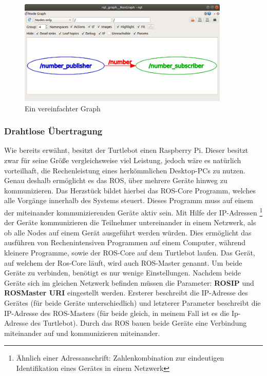 {{{			\begin{figure}
				\centering
				\includegraphics[height=5cm]{Bilder/rqt_graph_simplified.png}
				\caption{Ein vereinfachter Graph \\
					\parencite{rqtgraphsimplified1}} 
				\label{pic:rqt_graph_simplified}
			\end{figure}
		}
		
		\subsubsection{Drahtlose Übertragung}
		{ Wie bereits erwähnt, besitzt der Turtlebot einen Raspberry Pi. Dieser besitzt zwar für seine Größe vergleichsweise viel Leistung, jedoch wäre es natürlich vorteilhaft, die Rechenleistung eines herkömmlichen Desktop-PCs zu nutzen. Genau deshalb ermöglicht es das ROS, über mehrere Geräte hinweg zu kommunizieren. Das Herzstück bildet hierbei das ROS-Core Programm, welches alle Vorgänge innerhalb des Systems steuert. Dieses Programm muss auf einem der miteinander kommunizierenden Geräte aktiv sein. Mit Hilfe der IP-Adressen \footnote{Ähnlich einer Adressanschrift: Zahlenkombination zur eindeutigen Identifikation eines Gerätes in einem Netzwerk} der Geräte kommunizieren die Teilnehmer untereinander in einem Netzwerk, als ob alle Nodes auf einem Gerät ausgeführt werden würden. Dies ermöglicht das ausführen von Rechenintensiven Programmen auf einem Computer, während kleinere Programme, sowie der ROS-Core auf dem Turtlebot laufen. Das Gerät, auf welchem der Ros-Core läuft, wird auch ROS-Master genannt. Um beide Geräte zu verbinden, benötigt es nur wenige Einstellungen. Nachdem beide Geräte sich im gleichen Netzwerk befinden müssen die Parameter: \textbf{ROS\textunderscore IP} und \textbf{ROS\textunderscore Master \textunderscore URI} eingestellt werden. Ersterer beschreibt die IP-Adresse des Gerätes (für beide Geräte unterschiedlich) und letzterer Parameter beschreibt die IP-Adresse des ROS-Masters (für beide gleich, in meinem Fall ist es die Ip-Adresse des Turtlebot). Durch das ROS bauen beide Geräte eine Verbindung miteinander auf und kommunizieren miteinander. \parencite{roswikirqt}
			
}}}
